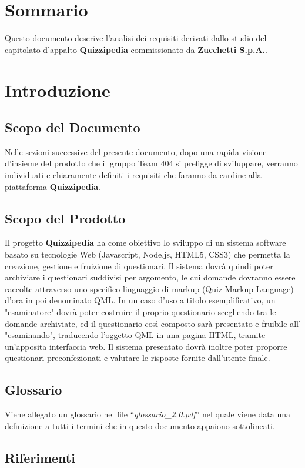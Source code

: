 \documentclass[a4paper,11pt]{article}
\begin{document}
	\renewcommand{\arraystretch}{2}
	\section*{Sommario}
	Questo documento descrive l’analisi dei requisiti derivati dallo studio del capitolato d’appalto \textbf{Quizzipedia} commissionato da \textbf{Zucchetti S.p.A.}.
	
	\newpage
	\section{Introduzione}
	\subsection{Scopo del Documento}
	Nelle sezioni successive del presente documento, dopo una rapida visione d'insieme del prodotto che il gruppo Team 404 si prefigge di sviluppare, verranno individuati e chiaramente definiti i requisiti che faranno da cardine alla piattaforma \textbf{Quizzipedia}.
	\subsection{Scopo del Prodotto}
	Il progetto \textbf{Quizzipedia} ha come obiettivo lo sviluppo di un sistema software basato su tecnologie Web (Javascript, Node.js, HTML5, CSS3) che permetta la creazione, gestione e fruizione di questionari. Il sistema dovrà quindi poter archiviare i questionari suddivisi per argomento, le cui domande dovranno essere raccolte attraverso uno specifico linguaggio di markup (Quiz Markup Language) d'ora in poi denominato QML. In un caso d'uso a titolo esemplificativo, un "esaminatore" dovrà poter costruire il proprio questionario scegliendo tra le domande archiviate, ed il questionario così composto sarà presentato e fruibile all' "esaminando", traducendo l'oggetto QML in una pagina HTML, tramite un'apposita interfaccia web. Il sistema presentato dovrà inoltre poter proporre questionari preconfezionati e valutare le risposte fornite dall'utente finale.
	\subsection{Glossario}
	Viene allegato un glossario nel file ``\textit{glossario\_2.0.pdf}'' nel quale viene data una definizione a tutti i termini che in questo documento appaiono sottolineati.
	\subsection{Riferimenti}
\end{document}
